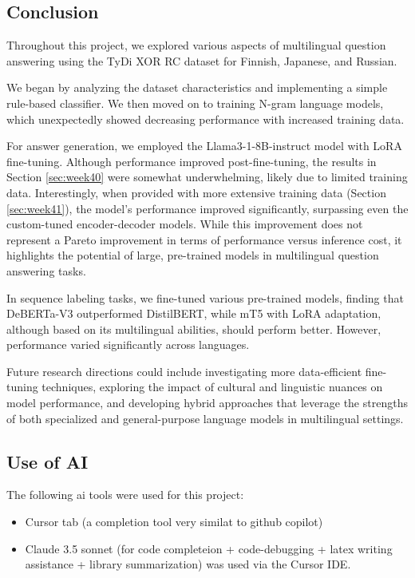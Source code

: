 \documentclass[11pt]{article}
\begin{document}
\subsection{Conclusion}

Throughout this project, we explored various aspects of multilingual question answering using the TyDi XOR RC dataset for Finnish, Japanese, and Russian. 

We began by analyzing the dataset characteristics and implementing a simple rule-based classifier. We then moved on to training N-gram language models, which unexpectedly showed decreasing performance with increased training data. 

For answer generation, we employed the Llama3-1-8B-instruct model with LoRA fine-tuning. Although performance improved post-fine-tuning, the results in Section \ref{sec:week40} were somewhat underwhelming, likely due to limited training data. Interestingly, when provided with more extensive training data (Section \ref{sec:week41}), the model's performance improved significantly, surpassing even the custom-tuned encoder-decoder models. While this improvement does not represent a Pareto improvement in terms of performance versus inference cost, it highlights the potential of large, pre-trained models in multilingual question answering tasks.

In sequence labeling tasks, we fine-tuned various pre-trained models, finding that DeBERTa-V3 outperformed DistilBERT, while mT5 with LoRA adaptation, although based on its multilingual abilities, should perform better. 
However, performance varied significantly across languages.

Future research directions could include investigating more data-efficient fine-tuning techniques, exploring the impact of cultural and linguistic nuances on model performance, and developing hybrid approaches that leverage the strengths of both specialized and general-purpose language models in multilingual settings.

\subsection{Use of AI}
The following ai tools were used for this project:

\begin{itemize}
    \item Cursor tab (a completion tool very similat to github copilot)
    \item Claude 3.5 sonnet (for code completeion + code-debugging + latex writing assistance + library summarization) was used via the Cursor IDE.
\end{itemize}
\end{document}
